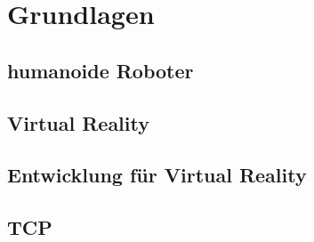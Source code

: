 \chapter{Grundlagen}
\section{humanoide Roboter}
\section{Virtual Reality}

\section{Entwicklung für Virtual Reality}
\section{TCP}
